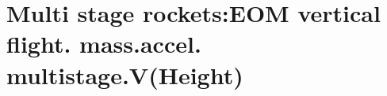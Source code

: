 \section{ Multi stage rockets:EOM vertical flight. mass.accel. multistage.V(Height) }\label{sec:q2}    
